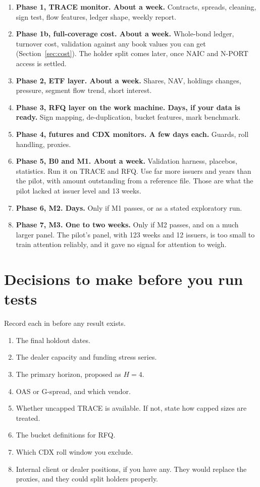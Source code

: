 \documentclass[11pt]{article}
\newcommand{\code}[1]{\texttt{\detokenize{#1}}}
\begin{document}
\begin{enumerate}
\item \textbf{Phase 1, TRACE monitor. About a week.} Contracts, spreads, cleaning, sign test, flow features, ledger shape, weekly report.
\item \textbf{Phase 1b, full-coverage cost. About a week.} Whole-bond ledger, turnover cost, validation against any book values you can get (Section~\ref{sec:cost}). The holder split comes later, once NAIC and N-PORT access is settled.
\item \textbf{Phase 2, ETF layer. About a week.} Shares, NAV, holdings changes, pressure, segment flow trend, short interest.
\item \textbf{Phase 3, RFQ layer on the work machine. Days, if your data is ready.} Sign mapping, de-duplication, bucket features, mark benchmark.
\item \textbf{Phase 4, futures and CDX monitors. A few days each.} Guards, roll handling, proxies.
\item \textbf{Phase 5, B0 and M1. About a week.} Validation harness, placebos, statistics. Run it on TRACE and RFQ. Use far more issuers and years than the pilot, with amount outstanding from a reference file. Those are what the pilot lacked at issuer level and 13 weeks.
\item \textbf{Phase 6, M2. Days.} Only if M1 passes, or as a stated exploratory run.
\item \textbf{Phase 7, M3. One to two weeks.} Only if M2 passes, and on a much larger panel. The pilot's panel, with 123 weeks and 12 issuers, is too small to train attention reliably, and it gave no signal for attention to weigh.
\end{enumerate}

\section{Decisions to make before you run tests}
Record each in \code{models.yaml} before any result exists.
\begin{enumerate}
\item The final holdout dates.
\item The dealer capacity and funding stress series.
\item The primary horizon, proposed as $H = 4$.
\item OAS or G-spread, and which vendor.
\item Whether uncapped TRACE is available. If not, state how capped sizes are treated.
\item The bucket definitions for RFQ.
\item Which CDX roll window you exclude.
\item Internal client or dealer positions, if you have any. They would replace the proxies, and they could split holders properly.
\end{enumerate}
\end{document}
